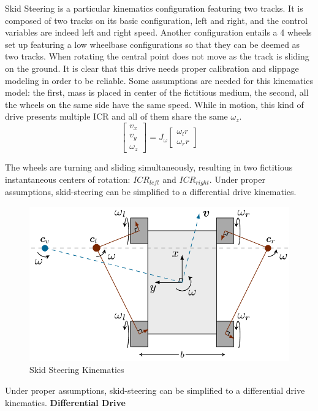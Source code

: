 Skid Steering is a particular kinematics configuration featuring two tracks. It is composed of two tracks on its basic configuration, left and right, and the control variables are indeed left and right speed.
Another configuration entails a 4 wheels set up featuring a low wheelbase configurations so that they can be deemed as two tracks.
When rotating the central point does not move as the track is sliding on the ground. It is clear that this drive needs proper calibration and slippage modeling in order to be reliable.
Some assumptions are needed for this kinematics model: the first, mass is placed in center of the fictitious medium, the second, all the wheels on the same side have the same speed.
While in motion, this kind of drive presents multiple ICR and all of them share the same $\omega_{z}$.
\begin{equation}
\begin{bmatrix}
    v_{x}\\
    v_{y}\\
    \omega_{z}
\end{bmatrix}
= J_{\omega} \begin{bmatrix}
\omega_{l}r\\
\omega_{r}r
\end{bmatrix}\end{equation}

 The wheels are turning and sliding simultaneously, resulting in two fictitious instantaneous centers of rotation: $ICR_{left}$ and $ICR_{right}$.
 Under proper assumptions, skid-steering can be simplified to a differential drive kinematics.
\begin{figure}[H]
    \centering
    \includegraphics[scale=0.40]{Images/Chapter 3/skidsteer2.png}
    \caption{Skid Steering Kinematics}
    \label{fig:skidsteer}
\end{figure}
 Under proper assumptions, skid-steering can be simplified to a differential drive kinematics.
 \newpage
\textbf{Differential Drive}

